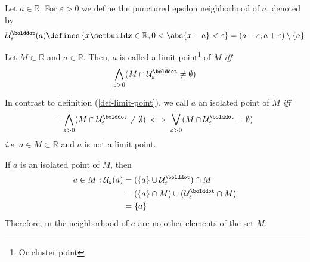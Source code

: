\begin{definition}\label{def-epsilon-punctured-neighborhood}
    Let $a\in\mathbb{R}$. For $\varepsilon>0$ we define the punctured epsilon 
    neighborhood of $a$, denoted by 
    \begin{equation}
        \mathcal{U}_{\varepsilon}^{\bolddot}(a)\defines
        \left\{x \setbuild x\in\mathbb{R}, 0<\abs{x-a}<\varepsilon\right\}=
        (a-\varepsilon,a+\varepsilon)\setminus\{a\}
    \end{equation}
\end{definition}

\begin{definition}\label{def-limit-point}
    Let $M\subset\mathbb{R}$ and $a\in\mathbb{R}$. Then, $a$ is called a limit 
    point\footnote{Or cluster point} of $M$ \textit{iff}
    \begin{equation}
        \bigwedge_{\varepsilon>0}(M\cap\mathcal{U}_\varepsilon^{\bolddot}\neq\emptyset)
    \end{equation}
\end{definition}

\begin{definition}\label{def-isolated-point}
    In contrast to definition (\ref{def-limit-point}), we call $a$ an isolated point
    of $M$ \textit{iff}
    \begin{equation}
        \neg\bigwedge_{\varepsilon>0}(M\cap\mathcal{U}_\varepsilon^{\bolddot}\neq\emptyset)
        \iff
        \bigvee_{\varepsilon>0}(M\cap\mathcal{U}_\varepsilon^{\bolddot}=\emptyset)
    \end{equation}
    \textit{i.e.} $a\in M\subset\mathbb{R}$ and $a$ is not a limit point.
\end{definition}

\begin{rem}
    If $a$ is an isolated point of $M$, then \cite[p.67]{wuest2009}
    \begin{align*}
        a\in M:\mathcal{U}_\varepsilon(a)
        &=(\{a\}\cup\mathcal{U}_\varepsilon^{\bolddot})\cap M \\
        &=(\{a\}\cap M)\cup(\mathcal{U}_\varepsilon^{\bolddot}\cap M) \\
        &=\{a\}
    \end{align*}
    Therefore, in the neighborhood of $a$ are no other elements of the set $M$.
\end{rem}

